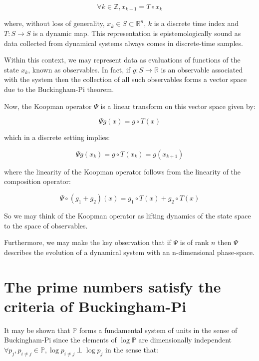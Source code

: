 \documentclass{article}
\begin{document}
\begin{equation}
\forall k \in \mathbb{Z}, x_{k+1} = T \circ x_k
\end{equation}

where, without loss of generality, $x_k \in S \subset \mathbb{R}^n$, $k$ is a discrete time index and $T:S \rightarrow S$ is a dynamic map. This representation is epistemologically sound as data collected from dynamical systems always comes in discrete-time samples.

Within this context, we may represent data as evaluations of functions of the state $x_k$, known as observables. In fact, if $g: S \rightarrow \mathbb{R}$ is an observable associated with the system then the collection of all such observables forms a vector space due to the Buckingham-Pi theorem.

Now, the Koopman operator $\Psi$ is a linear transform on this vector space given by:

\begin{equation}
\Psi g(x) = g \circ T(x)
\end{equation}

which in a discrete setting implies:

\begin{equation}
\Psi g(x_k) = g \circ T(x_k) = g(x_{k+1})
\end{equation}

where the linearity of the Koopman operator follows from the linearity of the composition operator:

\begin{equation}
\Psi \circ (g_1 + g_2)(x) = g_1 \circ T(x) + g_2 \circ T(x)
\end{equation}

So we may think of the Koopman operator as lifting dynamics of the state space to the space of observables.

Furthermore, we may make the key observation that if $\Psi$ is of rank $n$ then $\Psi$ describes the
evolution of a dynamical system with an n-dimensional phase-space.

\newpage 

\section{The prime numbers satisfy the criteria of Buckingham-Pi}

It may be shown that $\mathbb{P}$ forms a fundamental system of units in the sense of Buckingham-Pi since the
elements of $\log \mathbb{P}$ are dimensionally independent $\forall p_j, p_{i \neq j} \in \mathbb{P}, \log p_{i \neq j} \perp \log p_j$ in the sense that:
\end{document}
